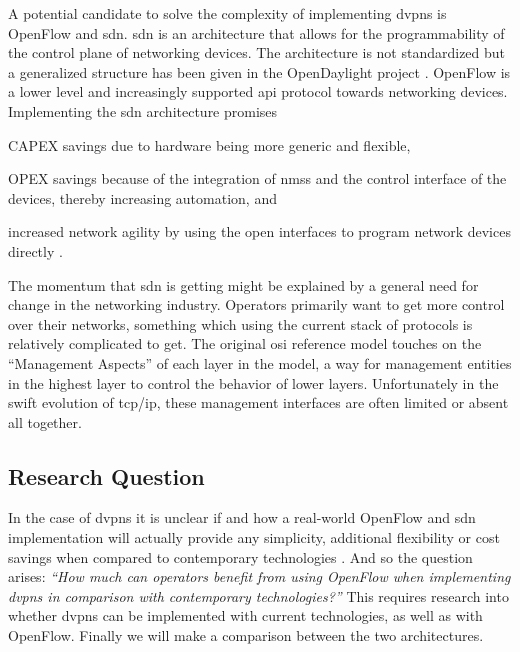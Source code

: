 A potential candidate to solve the complexity of implementing \acp{dvpn} is OpenFlow \cite{openflow} and \ac{sdn}. \ac{sdn} is an architecture that allows for the programmability of the control plane of networking devices. The architecture is not standardized but a generalized structure has been given in the OpenDaylight project \cite{opendaylight}. OpenFlow is a lower level and increasingly supported \ac{api} protocol towards networking devices. Implementing the \ac{sdn} architecture promises
\begin{inparaenum}
	\item CAPEX savings due to hardware being more generic and flexible,
	\item OPEX savings because of the integration of \acp{nms} and the control interface of the devices, thereby increasing automation, and
	\item increased network agility by using the open interfaces to program network devices directly \cite{packet-circuit}.
	\end{inparaenum} 

	
The momentum that \ac{sdn} is getting might be explained by a general need for change in the networking industry. Operators primarily want to get more control over their networks, something which using the current stack of protocols is relatively complicated to get. The original \acs{osi} reference model \cite{zimmermann} touches on the ``Management Aspects'' of each layer in the model, a way for management entities in the highest layer to control the behavior of lower layers. Unfortunately in the swift evolution of \ac{tcp}/\ac{ip}, these management interfaces are often limited or absent all together. 



	\subsection{Research Question} %
	\label{sub:research_question}
	In the case of \acp{dvpn} it is unclear if and how a real-world OpenFlow and \ac{sdn} implementation will actually provide any simplicity, additional flexibility or cost savings when compared to contemporary technologies \cite{programmability-answer}. And so the question arises: \textsl{``How much can operators benefit from using OpenFlow when implementing \aclp{dvpn} in comparison with contemporary technologies?''} 
	This requires research into whether \acp{dvpn} can be implemented with current technologies, as well as with OpenFlow. Finally we will make a comparison between the two architectures.

